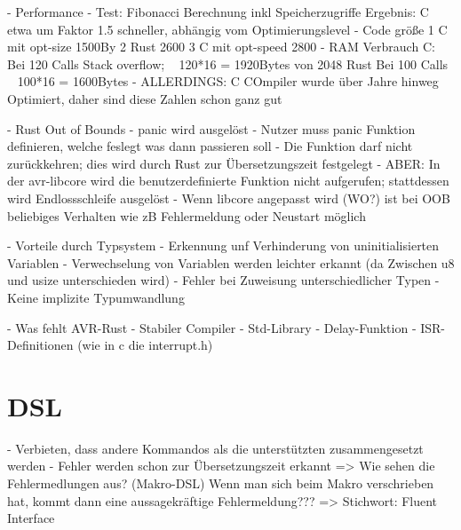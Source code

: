 \documentclass
[ 12pt,
  parskip=half %
]{scrreprt}
\begin{document}
- Performance
	- Test: Fibonacci Berechnung inkl Speicherzugriffe
		Ergebnis: C etwa um Faktor 1.5 schneller, abhängig vom Optimierungslevel
	- Code größe
		1 C mit opt-size	1500By
		2 Rust				2600
		3 C mit opt-speed	2800
	- RAM Verbrauch
		C: Bei 120 Calls Stack overflow; ~ 120*16 = 1920Bytes von 2048
		Rust Bei 100 Calls			~ 100*16  = 1600Bytes
	- ALLERDINGS: C COmpiler wurde über Jahre hinweg Optimiert, daher sind diese Zahlen schon ganz gut
	
- Rust Out of Bounds
	- panic wird ausgelöst
	- Nutzer muss panic Funktion definieren, welche feslegt was dann passieren soll
	- Die Funktion darf nicht zurückkehren; dies wird durch Rust zur Übersetzungszeit festgelegt
	- ABER: In der avr-libcore wird die benutzerdefinierte Funktion nicht aufgerufen; stattdessen wird Endlossschleife ausgelöst
	- Wenn libcore angepasst wird (WO?) ist bei OOB beliebiges Verhalten wie zB Fehlermeldung oder Neustart möglich
	
- Vorteile durch Typsystem
	- Erkennung unf Verhinderung von uninitialisierten  Variablen
	- Verwechselung von Variablen werden leichter erkannt 
		(da Zwischen u8 und usize unterschieden wird)
	- Fehler bei Zuweisung unterschiedlicher Typen - Keine implizite Typumwandlung
	
- Was fehlt AVR-Rust
	- Stabiler Compiler
	- Std-Library
		- Delay-Funktion
		- ISR-Definitionen (wie in c die interrupt.h) 

\section{DSL}

- Verbieten, dass andere Kommandos als die unterstützten zusammengesetzt werden
- Fehler werden schon zur Übersetzungszeit erkannt
	=> Wie sehen die Fehlermedlungen aus? (Makro-DSL)
		Wenn man sich beim Makro verschrieben hat, kommt dann eine aussagekräftige Fehlermeldung???
=> Stichwort: Fluent Interface

\nocite{*} %
\end{document}
